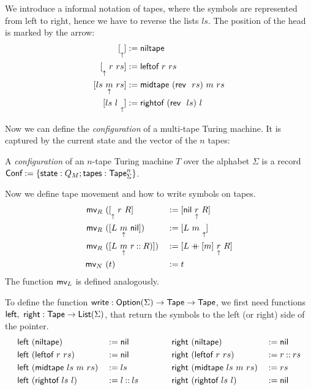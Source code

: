 We introduce a informal notation of tapes, where the symbols are represented from left to right, hence we have to reverse the lists $ls$.  The
position of the head is marked by the arrow:
\begin{align*}
  \niltape &:= \MS{niltape}\\
  \leftof{r}{rs} &:= \MS{leftof}~r~rs\\
  \midtape{ls}{m}{rs} &:= \MS{midtape}~(\rev~rs)~m~rs\\
  \rightof{ls}{l} &:= \MS{rightof}~(\rev~ls)~l
\end{align*}


Now we can define the \emph{configuration} of a multi-tape Turing machine.  It is captured by the current state and the vector of the $n$ tapes:
\begin{definition}[Configuration]
  \label{def:config}
  A \emph{configuration} of an $n$-tape Turing machine $T$ over the alphabet $\Sigma$ is a record $\textsf{Conf} := \{\textsf{state}:Q_M; \textsf{tapes}:\textsf{Tape}_\Sigma^n\}$.
\end{definition}

Now we define tape movement and how to write symbols on tapes.
\begin{alignat*}{2}
  \textsf{mv}_R&~([ \underset{\uparrow}{}~r~R ]               &&:= [ \textsf{nil}~\underset{\uparrow}{r}~R ] \\
  \textsf{mv}_R&~([ L~\underset{\uparrow}{m}~\textsf{nil} ])       &&:= [ L~m~\underset{\uparrow}{} ] \\
  \textsf{mv}_R&~([ L~\underset{\uparrow}{m}~r \mathbin{::} R) ]) &&:= [ L \mathbin{+\mkern-10mu+} [m]~\underset{\uparrow}{r}~R ] \\
  \textsf{mv}_N&~(t)                          &&:= t
\end{alignat*}
The function $\textsf{mv}_L$ is defined analogously.

To define the function $\textsf{write} : \textsf{Option}(\Sigma) \rightarrow \textsf{Tape} \rightarrow \textsf{Tape}$, we first need functions
$\textsf{left},~\textsf{right} : \textsf{Tape} \rightarrow \textsf{List}(\Sigma)$, that return the symbols to the left (or right) side of the pointer.
\begin{alignat*}{4}
  \textsf{left} &~(\textsf{niltape})                 &&:= \textsf{nil}
  \quad\quad\quad\quad
  & \textsf{right}&~(\textsf{niltape})               &&:= \textsf{nil} \\
  \textsf{left} &~(\textsf{leftof}~{r}~{rs})         &&:= \textsf{nil}
  & \textsf{right}&~(\textsf{leftof}~{r}~{rs})       &&:= r \mathbin{::} rs \\
  \textsf{left} &~(\textsf{midtape}~{ls}~{m}~{rs})   &&:= ls
  & \textsf{right}&~(\textsf{midtape}~{ls}~{m}~{rs}) &&:= rs \\
  \textsf{left} &~(\textsf{rightof}~{ls}~{l})        &&:= l \mathbin{::} ls
  & \textsf{right}&~(\textsf{rightof}~{ls}~{l})      &&:= \textsf{nil}
\end{alignat*}

